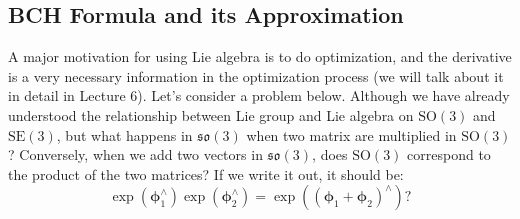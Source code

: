 \subsection{BCH Formula and its Approximation}
A major motivation for using Lie algebra is to do optimization, and the derivative is a very necessary information in the optimization process (we will talk about it in detail in Lecture 6). Let's consider a problem below. Although we have already understood the relationship between Lie group and Lie algebra on $\mathrm{SO}(3)$ and $\mathrm{SE}(3)$, but what happens in $\mathfrak{so}(3)$ when two matrix are multiplied in $\mathrm{SO}(3)$? Conversely, when we add two vectors in $\mathfrak{so}(3)$, does $\mathrm{SO}(3)$ correspond to the product of the two matrices? If we write it out, it should be:
\[
\exp \left( {\boldsymbol{\phi}_1^\wedge } \right)\exp \left( {\boldsymbol{\phi}_2^\wedge}\right) = \exp \left( {{{\left( {{\boldsymbol{\phi} _1} + {\boldsymbol{\phi} _2}} \right)}^ \wedge }} \right) ?
\]

